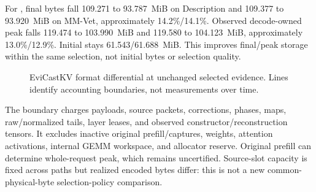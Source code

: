 \begin{table}[htbp]
\caption{Consumed-input storage in MiB. KV means ordinary lossless K/V
history within the same encoded-prompt path, not FullKV; source means
source-sealed history. Initial bytes are unchanged within each pair. Peak is
observed decode-owned storage, not whole-request HBM peak. These are format
differentials, not byte-matched selector comparisons.}
\label{tab:historystorage}
\end{table}

For \Evi{}, final bytes fall 109.271 to 93.787~MiB on Description and
109.377 to 93.920~MiB on MM-Vet, approximately 14.2\%/14.1\%. Observed
decode-owned peak falls 119.474 to 103.990~MiB and 119.580 to 104.123~MiB,
approximately 13.0\%/12.9\%. Initial stays 61.543/61.688~MiB. This improves
final/peak storage within the same selection, not initial bytes or selection
quality.

\begin{figure}[htbp]
\centering
{}
\caption{EviCastKV format differential at unchanged selected evidence.
Lines identify accounting boundaries, not measurements over time.}
\label{fig:historyboundaries}
\end{figure}

The boundary charges payloads, source packets, corrections, phases, maps,
raw/normalized tails, layer leases, and observed constructor/reconstruction
tensors. It excludes inactive original prefill/captures, weights, attention
activations, internal GEMM workspace, and allocator reserve. Original prefill
can determine whole-request peak, which remains uncertified. Source-slot
capacity is fixed across paths but realized encoded bytes differ: this is
not a new common-physical-byte selection-policy comparison.

